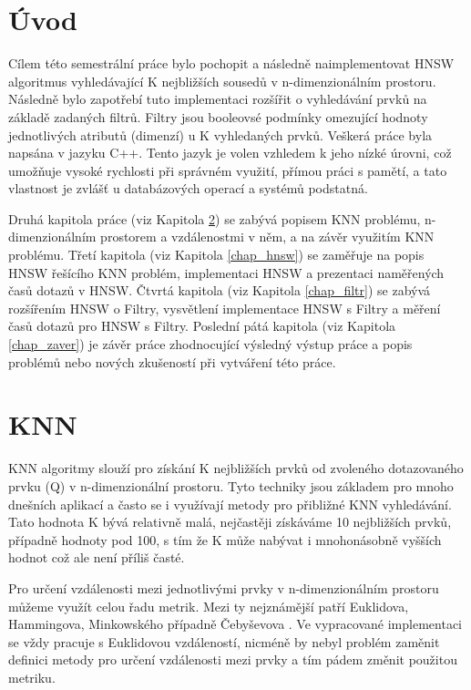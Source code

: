 \documentclass[czech,semestral,dept460,male,csharp,cpdeclaration]{diploma}
\begin{document}
	
	\MakeTitlePages
	
	\chapter{Úvod}
	
		Cílem této semestrální práce bylo pochopit a následně naimplementovat HNSW algoritmus vyhledávající K nejbližších sousedů v n-dimenzionálním prostoru. Následně bylo zapotřebí tuto implementaci rozšířit o vyhledávání prvků na základě zadaných filtrů. Filtry jsou booleovsé podmínky omezující hodnoty jednotlivých atributů (dimenzí) u K vyhledaných prvků. Veškerá práce byla napsána v jazyku C++. Tento jazyk je volen vzhledem k jeho nízké úrovni, což umožňuje vysoké rychlosti při správném využití, přímou práci s pamětí, a tato vlastnost je zvlášť u databázových operací a systémů podstatná.
		
		Druhá kapitola práce (viz Kapitola \ref{chap_knn}) se zabývá popisem KNN problému, n-dimenzionálním prostorem a vzdálenostmi v něm, a na závěr využitím KNN problému. Třetí kapitola (viz Kapitola \ref{chap_hnsw}) se zaměřuje na popis HNSW řešícího KNN problém, implementaci HNSW a prezentaci naměřených časů dotazů v HNSW. Čtvrtá kapitola (viz Kapitola \ref{chap_filtr}) se zabývá rozšířením HNSW o Filtry, vysvětlení implementace HNSW s Filtry a měření časů dotazů pro HNSW s Filtry. Poslední pátá kapitola (viz Kapitola \ref{chap_zaver}) je závěr práce zhodnocující výsledný výstup práce a popis problémů nebo nových zkušeností při vytváření této práce.
	
	\chapter{KNN}
	\label{chap_knn}
	
		KNN algoritmy slouží pro získání K nejbližších prvků od zvoleného dotazovaného prvku (Q) v n-dimenzionální prostoru. Tyto techniky jsou základem pro mnoho dnešních aplikací a často se i využívají metody pro přibližné KNN vyhledávání. Tato hodnota K bývá relativně malá, nejčastěji získáváme 10 nejbližších prvků, případně hodnoty pod 100, s tím že K může nabývat i mnohonásobně vyšších hodnot což ale není příliš časté.
		
		Pro určení vzdálenosti mezi jednotlivými prvky v n-dimenzionálním prostoru můžeme využít celou řadu metrik. Mezi ty nejznámější patří Euklidova, Hammingova, Minkowského případně Čebyševova \cite{Metriky}. Ve vypracované implementaci se vždy pracuje s Euklidovou vzdáleností, nicméně by nebyl problém zaměnit definici metody pro určení vzdálenosti mezi prvky a tím pádem změnit použitou metriku.
		
\end{document}
